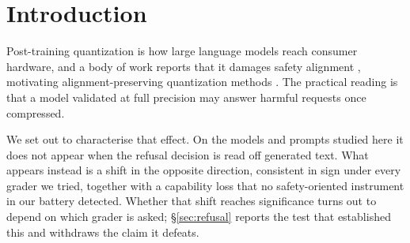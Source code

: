 \documentclass[11pt,a4paper]{article}
\begin{document}
\section{Introduction}

Post-training quantization \citep{frantar2023gptq,lin2024awq,dettmers2023qlora}
is how large language models reach consumer hardware, and a body of work reports
that it damages safety alignment
\citep{hong2024trust,egashira2024exploiting,egashira2025gguf,kadadekar2026quality},
motivating alignment-preserving quantization methods \citep{wee2025safety}. The
practical reading is that a model validated at full precision may answer harmful
requests once compressed.

We set out to characterise that effect. On the models and prompts studied here it
does not appear when the refusal decision is read off generated text. What
appears instead is a shift in the opposite direction, consistent in sign under
every grader we tried, together with a capability loss that no safety-oriented
instrument in our battery detected. Whether that shift reaches significance turns
out to depend on which grader is asked; \S\ref{sec:refusal} reports the test that
established this and withdraws the claim it defeats.
\end{document}
